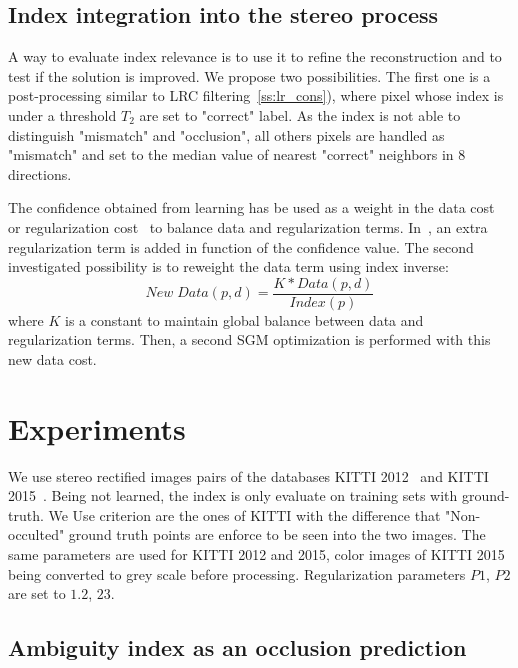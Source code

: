 \documentclass{article}
\begin{document}
\subsection{Index integration into the stereo process}
\label{ss:in_proc}

A way to evaluate index relevance is to use it to refine the reconstruction and to test if the solution is improved. We propose two possibilities. The first one is a post-processing similar to LRC filtering~\ref{ss:lr_cons}), where pixel whose index is under a threshold $T_2$ are set to "correct" label. As the index is not able to distinguish "mismatch" and "occlusion", all others pixels are handled as "mismatch" and set to the median value of nearest "correct" neighbors in 8 directions.

The confidence obtained from learning has be used as a weight in the data cost~\cite{park15} or regularization cost~\cite{spyropoulos14} to balance data and regularization terms. In~\cite{seki16}, an extra regularization term is added in function of the confidence value. The second investigated possibility is to reweight the data term using index inverse:
\begin{equation}
New \; Data(p,d) = \frac{K*Data(p,d)}{Index(p)}
\end{equation}
where $K$ is a constant to maintain global balance between data and regularization terms. Then, a second SGM optimization is performed with this new data cost.

\section{Experiments}
\label{sec:experimentation}

We use stereo rectified images pairs of the databases KITTI 2012~\cite{geiger13} and KITTI 2015~\cite{menze15}. Being not learned, the index is only evaluate on training sets with ground-truth. We Use criterion are the ones of KITTI with the difference that "Non-occulted" ground truth points are enforce to be seen into the two images. The same parameters are used for KITTI 2012 and 2015, color images of KITTI 2015 being converted to grey scale before processing. Regularization parameters $P1$, $P2$ are set to $1.2$, $23$.

\subsection{Ambiguity index as an occlusion prediction}
\end{document}
